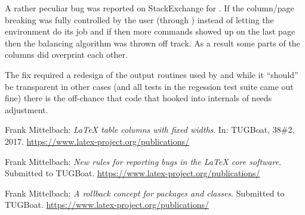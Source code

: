 \documentclass{ltnews}
\begin{document}
A rather peculiar bug was reported on StackExchange for
. If the column/page breaking was fully controlled by
the user (through ) instead of letting the environment
do its job and if then more  commands showed up on the
last page then the balancing algorithm was thrown off track.
As a result some parts of the columns did overprint each other.

The fix required a redesign of the output routines used by
 and while it ``should'' be transparent in other cases
(and all tests in the regession test suite came out fine) there is the
off-chance that code that hooked into internals of 
needs adjustment.



\begin{thebibliography}{9}
  
 Frank Mittelbach:
  \emph{\LaTeX{} table columns with fixed widths}.  
  In: TUGBoat, 38\#2, 2017.
  \url{https://www.latex-project.org/publications/}

 Frank Mittelbach:
  \emph{New rules for reporting bugs in the \LaTeX{} core software}.  
  Submitted to TUGBoat.
  \url{https://www.latex-project.org/publications/}

 Frank Mittelbach:
  \emph{A rollback concept for packages and classes}.  
  Submitted to TUGBoat.
  \url{https://www.latex-project.org/publications/}

\end{thebibliography}
\end{document}

